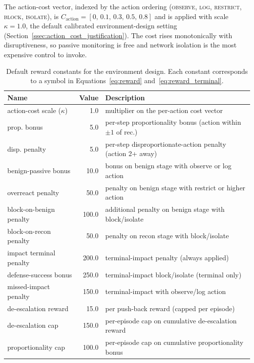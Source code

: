 The action-cost vector, indexed by the action ordering (\textsc{observe}, \textsc{log}, \textsc{restrict}, \textsc{block}, \textsc{isolate}), is $C_{\mathrm{action}} = [0,\, 0.1,\, 0.3,\, 0.5,\, 0.8]$ and is applied with scale $\kappa = 1.0$, the default calibrated environment-design setting (Section~\ref{ssec:action_cost_justification}). The cost rises monotonically with disruptiveness, so passive monitoring is free and network isolation is the most expensive control to invoke.

\begin{table}[!htbp]
\centering
\caption[Default reward constants for the environment design.]{Default reward constants for the environment design. Each constant corresponds to a symbol in Equations~\eqref{eq:reward} and~\eqref{eq:reward_terminal}.}
\label{tab:reward_constants}
\scriptsize
\begin{tabularx}{\textwidth}{lrX}
\toprule
Name & Value & Description \\
\midrule
action-cost scale ($\kappa$) & 1.0   & multiplier on the per-action cost vector \\
prop. bonus                  & 5.0   & per-step proportionality bonus (action within $\pm 1$ of rec.) \\
disp. penalty                & 5.0   & per-step disproportionate-action penalty (action 2+ away) \\
benign-passive bonus         & 10.0  & bonus on benign stage with observe or log action \\
overreact penalty            & 50.0  & penalty on benign stage with restrict or higher action \\
block-on-benign penalty      & 100.0 & additional penalty on benign stage with block/isolate \\
block-on-recon penalty       & 50.0  & penalty on recon stage with block/isolate \\
impact terminal penalty      & 200.0 & terminal-impact penalty (always applied) \\
defense-success bonus        & 250.0 & terminal-impact block/isolate (terminal only) \\
missed-impact penalty        & 150.0 & terminal-impact with observe/log action \\
de-escalation reward         & 15.0  & per push-back reward (capped per episode) \\
de-escalation cap            & 150.0 & per-episode cap on cumulative de-escalation reward \\
proportionality cap          & 100.0 & per-episode cap on cumulative proportionality bonus \\

\end{tabularx}
\end{table}
